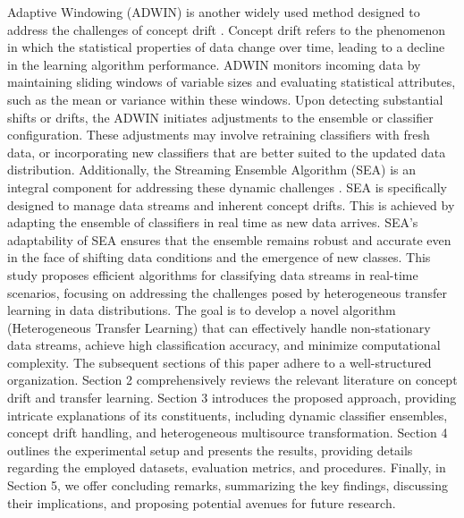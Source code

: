 Adaptive Windowing (ADWIN) is another widely used method designed to address the challenges of concept drift \cite{madkour2023historical}. Concept drift refers to the phenomenon in which the statistical properties of data change over time, leading to a decline in the learning algorithm performance. ADWIN monitors incoming data by maintaining sliding windows of variable sizes and evaluating statistical attributes, such as the mean or variance within these windows. Upon detecting substantial shifts or drifts, the ADWIN initiates adjustments to the ensemble or classifier configuration. These adjustments may involve retraining classifiers with fresh data, or incorporating new classifiers that are better suited to the updated data distribution. Additionally, the Streaming Ensemble Algorithm (SEA) is an integral component for addressing these dynamic challenges \cite{gama2004learning, adams2023explainable, madkour2023historical}. SEA is specifically designed to manage data streams and inherent concept drifts. This is achieved by adapting the ensemble of classifiers in real time as new data arrives. SEA's adaptability of SEA ensures that the ensemble remains robust and accurate even in the face of shifting data conditions and the emergence of new classes.
This study proposes efficient algorithms for classifying data streams in real-time scenarios, focusing on addressing the challenges posed by heterogeneous transfer learning in data distributions. The goal is to develop a novel algorithm (Heterogeneous Transfer Learning) that can effectively handle non-stationary data streams, achieve high classification accuracy, and minimize computational complexity. 
The subsequent sections of this paper adhere to a well-structured organization. Section 2 comprehensively reviews the relevant literature on concept drift and transfer learning. Section 3 introduces the proposed approach, providing intricate explanations of its constituents, including dynamic classifier ensembles, concept drift handling, and heterogeneous multisource transformation. Section 4 outlines the experimental setup and presents the results, providing details regarding the employed datasets, evaluation metrics, and procedures. Finally, in Section 5, we offer concluding remarks, summarizing the key findings, discussing their implications, and proposing potential avenues for future research.
